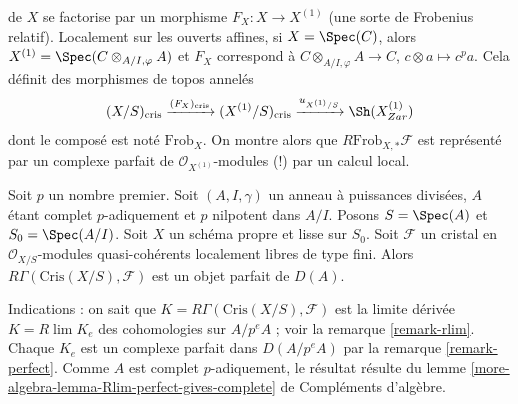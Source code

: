 \begin{remark}
de $X$ se factorise par un morphisme $F_X : X \to X^{(1)}$ (une sorte de
Frobenius relatif). Localement sur les ouverts affines, si $X = \Spec(C)$, alors
$X^{(1)} = \Spec( C \otimes_{A/I, \varphi} A)$
et $F_X$ correspond à $C \otimes_{A/I, \varphi} A \to C$,
$c \otimes a \mapsto c^pa$. Cela définit des morphismes de topos annelés
$$
(X/S)_{\text{cris}}
\xrightarrow{(F_X)_{\text{cris}}}
(X^{(1)}/S)_{\text{cris}}
\xrightarrow{u_{X^{(1)}/S}}
\Sh(X^{(1)}_{Zar})
$$
dont le composé est noté $\text{Frob}_X$. On montre alors que
$R\text{Frob}_{X, *}\mathcal{F}$ est représenté par un
complexe parfait de $\mathcal{O}_{X^{(1)}}$-modules (!)
par un calcul local.
\end{remark}

\begin{remark}
\label{remark-complete-perfect}
Soit $p$ un nombre premier. Soit $(A, I, \gamma)$ un anneau à puissances
divisées, $A$ étant complet $p$-adiquement et $p$ nilpotent dans $A/I$. Posons
$S = \Spec(A)$ et $S_0 = \Spec(A/I)$. Soit $X$ un schéma propre
et lisse sur $S_0$. Soit $\mathcal{F}$ un cristal en
$\mathcal{O}_{X/S}$-modules quasi-cohérents localement libres de type fini.
Alors $R\Gamma(\text{Cris}(X/S), \mathcal{F})$ est un
objet parfait de $D(A)$.

\medskip\noindent
Indications : on sait que $K = R\Gamma(\text{Cris}(X/S), \mathcal{F})$
est la limite dérivée $K = R\lim K_e$ des cohomologies sur $A/p^eA$ ;
voir la remarque \ref{remark-rlim}.
Chaque $K_e$ est un complexe parfait dans $D(A/p^eA)$ par la
remarque \ref{remark-perfect}.
Comme $A$ est complet $p$-adiquement, le résultat
résulte du
lemme \ref{more-algebra-lemma-Rlim-perfect-gives-complete} de Compléments d'algèbre.
\end{remark}

